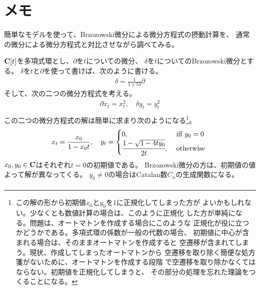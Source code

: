 	{\setlength\arraycolsep{2pt}
\section{メモ}\label{s1:メモ} %
	簡単なモデルを使って、Brzozowski微分による微分方程式の摂動計算を、
	通常の微分による微分方程式と対比させながら調べてみる。

	$\mathbf{C}[t]$を多項式環とし、$\partial$を$t$についての微分、
	$\delta$を$t$についてのBrzozowski微分とする。
	$\delta$を$t$と$\partial$を使って書けば、次のように書ける。
	\begin{equation}\label{eq:Brzozowski微分の表示その一}\begin{split}
		\delta = \frac{1}{1 + t\partial}\partial
	\end{split}\end{equation}
	そして、次の二つの微分方程式を考える。
	\begin{equation*}\begin{split}
		\partial x_t = x_t^2,\quad \delta y_t = y_t^2 \\
	\end{split}\end{equation*}
	この二つの微分方程式の解は簡単に求まり次のようになる\footnote{
		この解の形から初期値$x_0$と$y_0$を$1$に正規化してしまった方が
		よいかもしれない。少なくとも数値計算の場合は、このように正規化
		した方が単純になる。問題は、オートマトンを作成する場合にこのような
		正規化が役に立つかどうかである。多項式環の係数が一般の代数の場合、
		初期値に中心が含まれる場合は、そのままオートマトンを作成すると
		空遷移が含まれてしまう。現状、作成してしまったオートマトンから
		空遷移を取り除く簡便な処方箋がないために、オートマトンを作成する段階
		で空遷移を取り除かなくてはならない。初期値を正規化してしまうと、
		その部分の処理を忘れた理論をつくることになる。
	}。
	\begin{equation*}\begin{split}
		x_t = \frac{x_0}{1 - x_0t},\quad 
		y_t = \begin{cases}
			0, &\text{ iff } y_0 = 0 \\
			\cfrac{1 - \sqrt{1 - 4ty_0}}{2t}, &\text{ otherwise } \\
		\end{cases}
	\end{split}\end{equation*}
	$x_0,y_0\in\mathbf{C}$はそれぞれ$t=0$の初期値である。
	Brzozowski微分の方は、初期値の値よって解が異なってくる。
	$y_0\neq0$の場合はCatalan数$C_n$の生成関数になる。
	\begin{equation*}\begin{split}

\end{split}
\end{equation*}}
